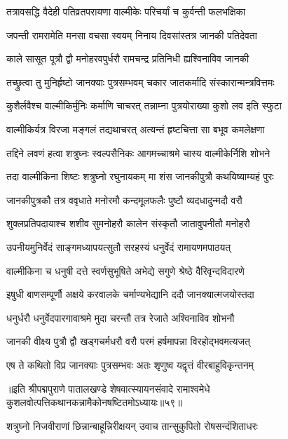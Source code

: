 \twolineshloka
{तत्रावसद्धि वैदेही पतिव्रतपरायणा}
{वाल्मीकेः परिचर्यां च कुर्वन्ती फलभक्षिका}%

\twolineshloka
{जपन्ती रामरामेति मनसा वचसा स्वयम्}
{निनाय दिवसांस्तत्र जानकी पतिदेवता}%

\twolineshloka
{काले सासूत पूत्रौ द्वौ मनोहरवपुर्धरौ}
{रामचन्द्र प्रतिनिधी ह्यश्विनाविव जानकी}%

\twolineshloka
{तच्छ्रुत्वा तु मुनिर्हृष्टो जानक्याः पुत्रसम्भवम्}
{चकार जातकर्मादि संस्कारान्मन्त्रवित्तमः}%

\twolineshloka
{कुशैर्लवैश्च वाल्मीकिर्मुनिः कर्माणि चाचरत्}
{तन्नाम्ना पुत्रयोराख्या कुशो लव इति स्फुटा}%

\twolineshloka
{वाल्मीकिर्यत्र विरजा मङ्गलं तद्यथाचरत्}
{अत्यन्तं हृष्टचित्ता सा बभूव कमलेक्षणा}%

\twolineshloka
{तद्दिने लवणं हत्वा शत्रुघ्नः स्वल्पसैनिकः}
{आगमच्चाश्रमे चास्य वाल्मीकेर्निशि शोभने}%

\twolineshloka
{तदा वाल्मीकिना शिष्टः शत्रुघ्नो रघुनायकम्}
{मा शंस जानकीपुत्रौ कथयिष्याम्यहं पुरः}%

\twolineshloka
{जानकीपुत्रकौ तत्र ववृधाते मनोरमौ}
{कन्दमूलफलैः पुष्टौ व्यदधादुन्मदौ वरौ}%

\twolineshloka
{शुक्लप्रतिपदायाश्च शशीव सुमनोहरौ}
{कालेन संस्कृतौ जातावुपनीतौ मनोहरौ}%

\twolineshloka
{उपनीयमुनिर्वेदं साङ्गमध्यापयत्सुतौ}
{सरहस्यं धनुर्वेदं रामायणमपाठयत्}%

\twolineshloka
{वाल्मीकिना च धनुषी दत्ते स्वर्णसुभूषिते}
{अभेद्ये सगुणे श्रेष्ठे वैरिवृन्दविदारणे}%

\twolineshloka
{इषुधी बाणसम्पूर्णौ अक्षये करवालके}
{चर्माण्यभेद्यानि ददौ जानक्यात्मजयोस्तदा}%

\twolineshloka
{धनुर्धरौ धनुर्वेदपारगावाश्रमे मुदा}
{चरन्तौ तत्र रेजाते अश्विनाविव शोभनौ}%

\twolineshloka
{जानकी वीक्ष्य पुत्रौ द्वौ खड्गचर्मधरौ वरौ}
{परमं हर्षमापन्ना विरहोद्भवमत्यजत्}%

\twolineshloka
{एष ते कथितो विप्र जानक्याः पुत्रसम्भवः}
{अतः शृणुष्व यद्वृत्तं वीरबाहुविकृन्तनम्}%

{॥इति श्रीपद्मपुराणे पातालखण्डे शेषवात्स्यायनसंवादे रामाश्वमेधे कुशलवोत्पत्तिकथानकन्नामैकोनषष्टितमोऽध्यायः॥५९॥}

\resetShloka


\twolineshloka
{शत्रुघ्नो निजवीराणां छिन्नान्बाहून्निरीक्षयन्}
{उवाच तान्सुकुपितो रोषसन्दंशिताधरः}%

